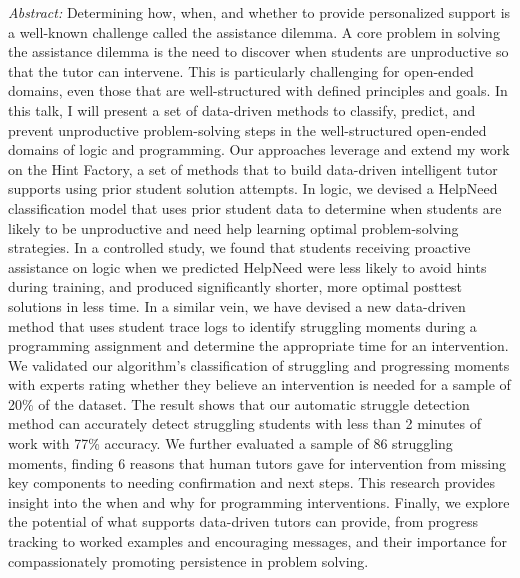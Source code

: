 \documentclass[letterpaper,11pt,oneside]{book} %
\begin{document}
\emph{Abstract:} Determining how, when, and whether to provide
personalized support is a well-known challenge called the assistance
dilemma. A core problem in solving the assistance dilemma is the need to
discover when students are unproductive so that the tutor can intervene.
This is particularly challenging for open-ended domains, even those that
are well-structured with defined principles and goals. In this talk, I
will present a set of data-driven methods to classify, predict, and
prevent unproductive problem-solving steps in the well-structured
open-ended domains of logic and programming. Our approaches leverage and
extend my work on the Hint Factory, a set of methods that to build
data-driven intelligent tutor supports using prior student solution
attempts. In logic, we devised a HelpNeed classification model that uses
prior student data to determine when students are likely to be
unproductive and need help learning optimal problem-solving strategies.
In a controlled study, we found that students receiving proactive
assistance on logic when we predicted HelpNeed were less likely to avoid
hints during training, and produced significantly shorter, more optimal
posttest solutions in less time. In a similar vein, we have devised a
new data-driven method that uses student trace logs to identify
struggling moments during a programming assignment and determine the
appropriate time for an intervention. We validated our algorithm's
classification of struggling and progressing moments with experts rating
whether they believe an intervention is needed for a sample of 20\% of
the dataset. The result shows that our automatic struggle detection
method can accurately detect struggling students with less than 2
minutes of work with 77\% accuracy. We further evaluated a sample of 86
struggling moments, finding 6 reasons that human tutors gave for
intervention from missing key components to needing confirmation and
next steps. This research provides insight into the when and why for
programming interventions. Finally, we explore the potential of what
supports data-driven tutors can provide, from progress tracking to
worked examples and encouraging messages, and their importance for
compassionately promoting persistence in problem solving.

\clearpage


{}
\end{document}
